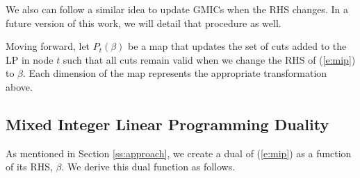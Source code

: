 \documentclass[10pt]{article}
\begin{document}
	We also can follow a similar idea to update GMICs when the RHS changes. In a future version of this work, we will detail that procedure as well.
	
	Moving forward, let $ P_t(\beta) $ be a map that updates the set of cuts added to the LP in node $ t $ such that all cuts remain valid when we change the RHS of (\ref{e:mip}) to $ \beta $. Each dimension of the map represents the appropriate transformation above.
	
	\subsection{Mixed Integer Linear Programming Duality} \label{ss:duality}
	As mentioned in Section \ref{ss:approach}, we create a dual of (\ref{e:mip}) as a function of its RHS, $ \beta $. We derive this dual function as follows.
	
\end{document}
